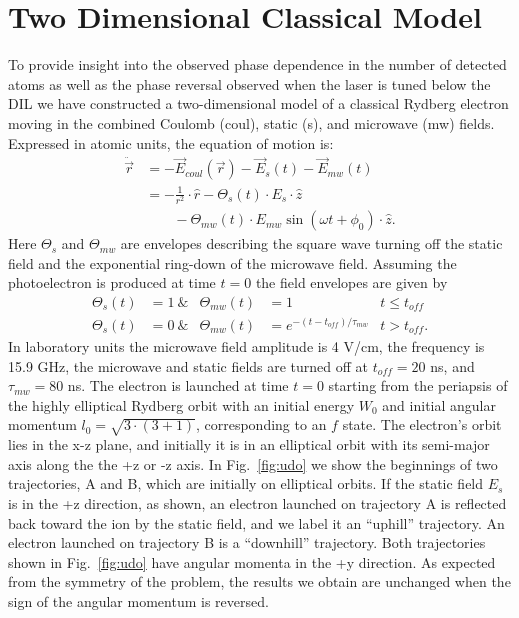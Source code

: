\documentclass[aps,pra,reprint,groupedaddress]{revtex4-1}
\begin{document}
\section{\label{sec:disc} Two Dimensional Classical Model}

To provide insight into the observed phase dependence in the number of detected atoms as well as the phase reversal observed when the laser is tuned below the DIL we have constructed a two-dimensional model of a classical Rydberg electron moving in the combined Coulomb (coul), static (s), and microwave (mw) fields. Expressed in atomic units, the equation of motion is:
\begin{equation}
\begin{aligned}
\ddot{\vec{r}} & = -\vec{E}_{coul}(\vec{r}) - \vec{E}_{s}(t) - \vec{E}_{mw}(t) \\
 & = -\frac{1}{r^2} \cdot \hat{r} - \Theta_s(t) \cdot E_{s} \cdot \hat{z} \\
 & \quad \quad - \Theta_{mw}(t) \cdot E_{mw} \sin{(\omega t + \phi_0)} \cdot \hat{z}.
\end{aligned}
\end{equation}
Here $\Theta_s$ and $\Theta_{mw}$ are envelopes describing the square wave turning off the static field and the exponential ring-down of the microwave field. Assuming the photoelectron is produced at time $t=0$ the field envelopes are given by
\begin{equation}
\begin{aligned}
\Theta_s(t) & = 1 \ \& & \Theta_{mw}(t) & = 1  & t \leq t_{off} \\
\Theta_s(t) & = 0 \ \& & \Theta_{mw}(t) & = e^{-(t-t_{off})/\tau_{mw}} & t > t_{off}.
\end{aligned}
\end{equation}
In laboratory units the microwave field amplitude is 4 V/cm, the frequency is 15.9 GHz, the microwave and static fields are turned off at $t_{off} = 20$ ns, and $\tau_{mw} = 80$ ns. The electron is launched at time $t=0$ starting from the periapsis of the highly elliptical Rydberg orbit with an initial energy $W_0$ and initial angular momentum $l_0 = \sqrt{3 \cdot (3+1)}$, corresponding to an $f$ state. The electron's orbit lies in the x-z plane, and initially it is in an elliptical orbit with its semi-major axis along the the +z or -z axis. In Fig.~\ref{fig:udo} we show the beginnings of two trajectories, A and B, which are initially on elliptical orbits. If the static field $E_s$ is in the +z direction, as shown, an electron launched on trajectory A is reflected back toward the ion by the static field, and we label it an ``uphill'' trajectory. An electron launched on trajectory B is a ``downhill'' trajectory. Both trajectories shown in Fig.~\ref{fig:udo} have angular momenta in the +y direction. As expected from the symmetry of the problem, the results we obtain are unchanged when the sign of the angular momentum is reversed.
\end{document}
